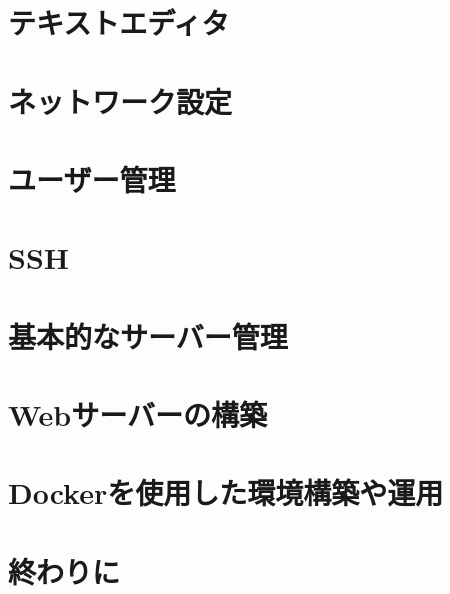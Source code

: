 \documentclass[a4paper, 11pt, dvipdfmx]{jsarticle}
\begin{document}
\section{テキストエディタ}

\section{ネットワーク設定}

\section{ユーザー管理}

\section{SSH}

\section{基本的なサーバー管理}

\section{Webサーバーの構築}

\section{Dockerを使用した環境構築や運用}

\section{終わりに}
\end{document}
